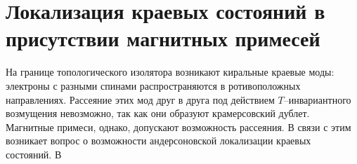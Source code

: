 \newpage
\section{Локализация краевых состояний в присутствии магнитных примесей}
На границе топологического изолятора возникают киральные краевые моды: электроны 
с разными спинами распространяются в ротивоположных направлениях. Рассеяние этих мод 
друг в друга под действием $T$--инвариантного возмущения невозможно, так как они образуют
крамерсовский дублет. Магнитные примеси, однако, допускают возможность рассеяния. В связи
с этим возникает вопрос о возможности андерсоновской локализации краевых состояний. В 
